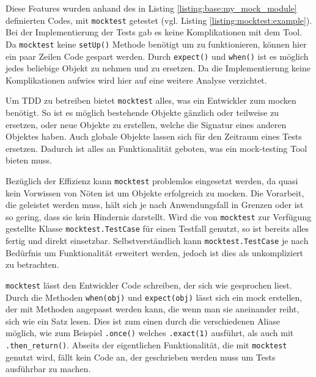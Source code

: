 Diese Features wurden anhand des in Listing \ref{listing:base:my_mock_module}
definierten Codes, mit \lstinline{mocktest} getestet (vgl. Listing
\ref{listing:mocktest:example}). Bei der Implementierung der Tests gab es keine
Komplikationen mit dem Tool. Da \lstinline{mocktest} keine \lstinline{setUp()}
Methode benötigt um zu funktionieren, können hier ein paar Zeilen Code gespart
werden. Durch \lstinline{expect()} und \lstinline{when()} ist es möglich jedes
beliebige Objekt zu nehmen und zu ersetzen. Da die Implementierung keine
Komplikationen aufwies wird hier auf eine weitere Analyse verzichtet.
\newline

Um TDD zu betreiben bietet \lstinline{mocktest} alles, was ein Entwickler zum
\gls{mock}en benötigt. So ist es möglich bestehende Objekte gänzlich oder
teilweise zu ersetzen, oder neue Objekte zu erstellen, welche die Signatur eines
anderen Objektes haben. Auch globale Objekte lassen sich für den Zeitraum eines
Tests ersetzen. Dadurch ist alles an Funktionalität geboten, was ein
\gls{mock}-testing Tool bieten muss.

Bezüglich der Effizienz kann \lstinline{mocktest} problemlos eingesetzt werden,
da quasi kein Vorwissen von Nöten ist um Objekte erfolgreich zu \gls{mock}en.
Die Vorarbeit, die geleistet werden muss, hält sich je nach Anwendungsfall in
Grenzen oder ist so gering, dass sie kein Hindernis darstellt. Wird die von
\lstinline{mocktest} zur Verfügung gestellte Klasse
\lstinline{mocktest.TestCase} für einen Testfall genutzt, so ist bereits alles
fertig und direkt einsetzbar. Selbstverständlich kann
\lstinline{mocktest.TestCase} je nach Bedürfnis um Funktionalität erweitert
werden, jedoch ist dies als unkompliziert zu betrachten.

\lstinline{mocktest} lässt den Entwickler Code schreiben, der sich wie
gesprochen liest. Durch die Methoden \lstinline{when(obj)} und
\lstinline{expect(obj)} lässt sich ein \Gls{mock} erstellen, der mit Methoden
angepasst werden kann, die wenn man sie aneinander reiht, sich wie ein Satz
lesen. Dies ist zum einen durch die verschiedenen Aliase möglich, wie zum
Beispiel \lstinline{.once()} welches \lstinline{.exact(1)} ausführt, als auch
mit \lstinline{.then_return()}. Abseits der eigentlichen Funktionalität, die
mit \lstinline{mocktest} genutzt wird, fällt kein Code an, der geschrieben
werden muss um Tests ausführbar zu machen.